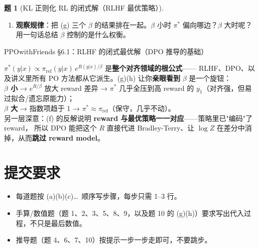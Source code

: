 \documentclass[11pt,a4paper]{article}
\theoremstyle{definition}
\newtheorem{problem}{题}
\begin{document}
\begin{problem}[KL 正则化 RL 的闭式解（RLHF 最优策略）]
\begin{enumerate}[label=(\alph*)]
    \item \textbf{观察规律}：把 (g) 三个 $\beta$ 的结果排在一起。$\beta$ 小时 $\pi^*$ 偏向哪边？$\beta$ 大时呢？
    用一句话总结 $\beta$ 控制的是什么权衡。
\end{enumerate}
\begin{topicbox}
PPOwithFriends §6.1：RLHF 的闭式最优解（DPO 推导的基础）
\end{topicbox}
\begin{takeaway}
$\pi^*(y|x) \propto \pi_{\mathrm{ref}}(y|x)\, e^{R(y|x)/\beta}$ 是\textbf{整个对齐领域的根公式}——
RLHF、DPO、以及讲义里所有 PO 方法都从它派生。(g)(h) 让你\textbf{亲眼看到} $\beta$ 是一个旋钮：\\
\textbf{$\beta$ 小} → $e^{R/\beta}$ 放大 reward 差异 → $\pi^*$ 几乎全压到高 reward 的 $y_1$（对齐强，但易过拟合/遗忘原能力）；\\
\textbf{$\beta$ 大} → 指数项趋于 1 → $\pi^* \approx \pi_{\mathrm{ref}}$（保守，几乎不动）。\\
另一层深意：(f) 的反解说明 \textbf{reward 与最优策略一一对应}——策略里已"编码"了 reward，
所以 DPO 能把这个 $R$ 直接代进 Bradley-Terry、让 $\log Z$ 在差分中消掉，从而\textbf{跳过 reward model}。
\end{takeaway}
\end{problem}

\bigskip

\section*{提交要求}

\begin{itemize}
    \item 每道题按 (a)(b)(c)\ldots\ 顺序写步骤，每步只需 1--3 行。
    \item 手算/数值题（题 1、2、3、5、8、9，以及题 10 的 (g)(h)）要求写出代入过程，不只是最后数值。
    \item 推导题（题 4、6、7、10）按提示一步一步走即可，不要跳步。
\end{itemize}
\end{document}
